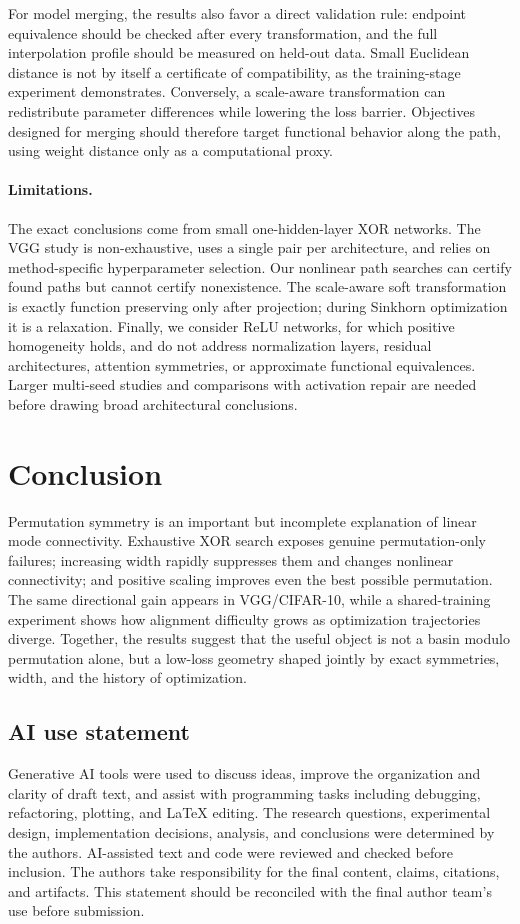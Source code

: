 \documentclass{article}
\begin{document}
For model merging, the results also favor a direct validation rule: endpoint
equivalence should be checked after every transformation, and the full
interpolation profile should be measured on held-out data.  Small Euclidean
distance is not by itself a certificate of compatibility, as the training-stage
experiment demonstrates.  Conversely, a scale-aware transformation can
redistribute parameter differences while lowering the loss barrier.  Objectives
designed for merging should therefore target functional behavior along the
path, using weight distance only as a computational proxy.

\paragraph{Limitations.}
The exact conclusions come from small one-hidden-layer XOR networks.  The VGG
study is non-exhaustive, uses a single pair per architecture, and relies on
method-specific hyperparameter selection.  Our nonlinear path searches can
certify found paths but cannot certify nonexistence.  The scale-aware soft
transformation is exactly function preserving only after projection; during
Sinkhorn optimization it is a relaxation.  Finally, we consider ReLU networks,
for which positive homogeneity holds, and do not address normalization layers,
residual architectures, attention symmetries, or approximate functional
equivalences.  Larger multi-seed studies and comparisons with activation repair
are needed before drawing broad architectural conclusions.

\section{Conclusion}

Permutation symmetry is an important but incomplete explanation of linear mode
connectivity.  Exhaustive XOR search exposes genuine permutation-only failures;
increasing width rapidly suppresses them and changes nonlinear connectivity;
and positive scaling improves even the best possible permutation.  The same
directional gain appears in VGG/CIFAR-10, while a shared-training experiment
shows how alignment difficulty grows as optimization trajectories diverge.
Together, the results suggest that the useful object is not a basin modulo
permutation alone, but a low-loss geometry shaped jointly by exact symmetries,
width, and the history of optimization.

\subsection*{AI use statement}
Generative AI tools were used to discuss ideas, improve the organization and
clarity of draft text, and assist with programming tasks including debugging,
refactoring, plotting, and \LaTeX{} editing.  The research questions,
experimental design, implementation decisions, analysis, and conclusions were
determined by the authors.  AI-assisted text and code were reviewed and checked
before inclusion.  The authors take responsibility for the final content,
claims, citations, and artifacts.  This statement should be reconciled with the
final author team's use before submission.
\end{document}
